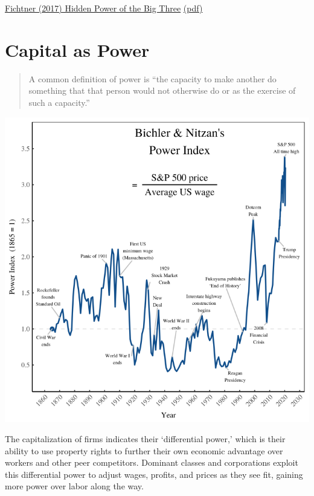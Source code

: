 \documentclass[
]{book}
\begin{document}
\href{https://www.cambridge.org/core/journals/business-and-politics/article/hidden-power-of-the-big-three-passive-index-funds-reconcentration-of-corporate-ownership-and-new-financial-risk/30AD689509AAD62F5B677E916C28C4B6}{Fichtner (2017) Hidden Power of the Big Three}
\href{pdf/Fichtner_2017_Hidden_Power_Big3.pdf}{(pdf)}

\hypertarget{capital-as-power}{%
\chapter{Capital as Power}\label{capital-as-power}}

\begin{quote}
A common definition of power is ``the capacity to make another do something that that person would not otherwise do or as the exercise of such a capacity.''
\end{quote}

\includegraphics{fig/power_index.png}

The capitalization of firms indicates their `differential power,' which is their ability to use property rights to further their own economic advantage over workers and other peer competitors. Dominant classes and corporations exploit this differential power to adjust wages, profits, and prices as they see fit, gaining more power over labor along the way.
\end{document}
